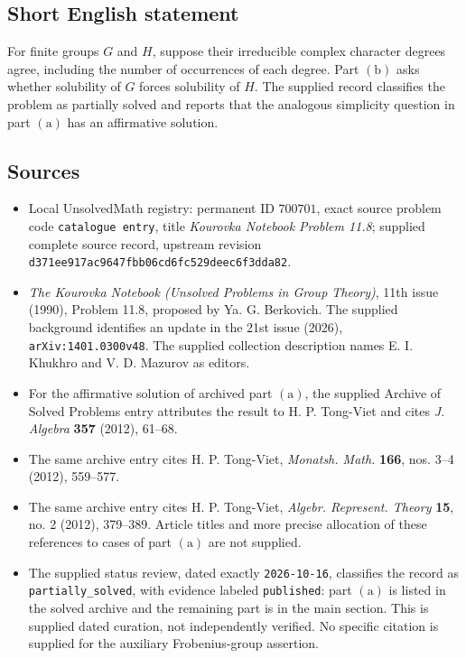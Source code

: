 \documentclass[11pt]{article}
\begin{document}
\subsection{Short English statement}
For finite groups \(G\) and \(H\), suppose their irreducible complex character degrees agree, including the number of occurrences of each degree. Part \(\mathrm{(b)}\) asks whether solubility of \(G\) forces solubility of \(H\). The supplied record classifies the problem as partially solved and reports that the analogous simplicity question in part \(\mathrm{(a)}\) has an affirmative solution.
\subsection{Sources}
\begin{itemize}
\item Local UnsolvedMath registry: permanent ID \(700701\), exact source problem code \texttt{catalogue entry}, title \emph{Kourovka Notebook Problem 11.8}; supplied complete source record, upstream revision \texttt{d371ee917ac9647fbb06cd6fc529deec6f3dda82}.
\item \emph{The Kourovka Notebook (Unsolved Problems in Group Theory)}, 11th issue (1990), Problem 11.8, proposed by Ya. G. Berkovich. The supplied background identifies an update in the 21st issue (2026), \texttt{arXiv:1401.0300v48}. The supplied collection description names E. I. Khukhro and V. D. Mazurov as editors.
\item For the affirmative solution of archived part \(\mathrm{(a)}\), the supplied Archive of Solved Problems entry attributes the result to H. P. Tong-Viet and cites \emph{J. Algebra} \textbf{357} (2012), 61--68.
\item The same archive entry cites H. P. Tong-Viet, \emph{Monatsh. Math.} \textbf{166}, nos. 3--4 (2012), 559--577.
\item The same archive entry cites H. P. Tong-Viet, \emph{Algebr. Represent. Theory} \textbf{15}, no. 2 (2012), 379--389. Article titles and more precise allocation of these references to cases of part \(\mathrm{(a)}\) are not supplied.
\item The supplied status review, dated exactly \texttt{2026-10-16}, classifies the record as \texttt{partially\_solved}, with evidence labeled \texttt{published}: part \(\mathrm{(a)}\) is listed in the solved archive and the remaining part is in the main section. This is supplied dated curation, not independently verified. No specific citation is supplied for the auxiliary Frobenius-group assertion.
\end{itemize}
\end{document}
